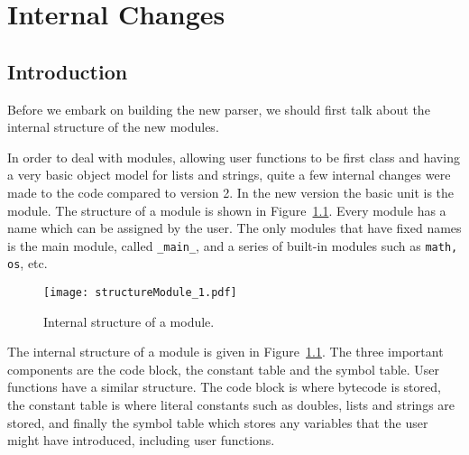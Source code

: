 {\bfseries\slshape\sffamily\color{ChapterTitleColor} \chapter{Internal Changes}} \label{chap:internalChanges}

\section{Introduction}

Before we embark on building the new parser, we should first talk about the internal structure of the new modules.

In order to deal with modules, allowing user functions to be first class and having a very basic object model for lists and strings, quite a few internal changes were made to the code compared to version 2. In the new version the basic unit is the module. The structure of a module is shown in Figure~\ref{fig:StructureModule1}. Every module has a name which can be assigned by the user. The only modules that have fixed names is the main module, called {\tt _main_}, and a series of built-in modules such as {\tt math, os}, etc.

\begin{figure}[htpb]
\centering
\texttt{[image: structureModule\_1.pdf]}
\caption{Internal structure of a module.}
\label{fig:StructureModule1}
\end{figure}

The internal structure of a module is given in Figure~\ref{fig:StructureModule1}. The three important components are the code block, the constant table and the symbol table. User functions have a similar structure. The code block is where bytecode is stored, the constant table is where literal constants such as doubles, lists and strings are stored, and finally the symbol table which stores any variables that the user might have introduced, including user functions.

%
%
%
%
%

